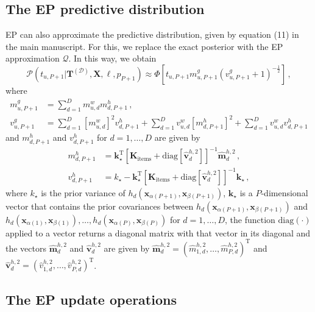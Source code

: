 \documentclass{article}
\begin{document}
\subsection{The EP predictive distribution}

EP can also approximate the predictive distribution, given by equation (11) in the main manuscript. 
For this, we replace the exact posterior with the EP approximation $\mathcal{Q}$. In this way, we obtain
\begin{equation}
\mathcal{P}(t_{u,P+1}|\mathbf{T}^{(\mathcal{D})},\mathbf{X},\ell,p_{P+1}) \approx 
\Phi\left[t_{u,P+1} m_{u,P+1}^g(v_{u,P+1}^g + 1)^{-\frac{1}{2}}\right]\,,
\end{equation}
where
\begin{align}
m_{u,P+1}^g & = \sum_{d=1}^D  m_{u,d}^w m_{d,P+1}^h\,,\\
v_{u,P+1}^g & = \sum_{d=1}^D  [m_{u,d}^w]^2 v_{d,P+1}^h + \sum_{d=1}^D v_{u,d}^w [m_{d,P+1}^h]^2 + \sum_{d=1}^D v_{u,d}^w v_{d,P+1}^h
\end{align}
and $m_{d,P+1}^h$ and $v_{d,P+1}^h$ for $d = 1,\ldots,D$ are given by
\begin{align}
m_{d,P+1}^h & = \mathbf{k}_\star^\text{T} \left[ \mathbf{K}_\text{items} +
\text{diag}[\hat{\mathbf{v}}_d^{h,2}] \right]^{-1} \hat{\mathbf{m}}_d^{h,2}\,,\label{eq:predictiveMean}\\
v_{d,P+1}^h & = k_\star - \mathbf{k}_\star^\text{T} \left[ \mathbf{K}_\text{items} +
\text{diag}[\hat{\mathbf{v}}_d^{h,2}] \right]^{-1} \mathbf{k}_\star\,,\label{eq:predictiveVariance}
\end{align}
where $k_\star$ is the prior variance of $h_d(\mathbf{x}_{\alpha(P+1)}, \mathbf{x}_{\beta(P+1)})$,
$\mathbf{k}_\star$ is a $P$-dimensional vector that contains the prior covariances between $h_d(\mathbf{x}_{\alpha(P+1)}, \mathbf{x}_{\beta(P+1)})$
and $h_d(\mathbf{x}_{\alpha(1)}, \mathbf{x}_{\beta(1)}),\ldots,h_d(\mathbf{x}_{\alpha(P)}, \mathbf{x}_{\beta(P)})$ for $d=1,\ldots,D$,
the function $\text{diag}(\cdot)$ applied to a vector returns a diagonal matrix with that vector in
its diagonal and the vectors $\hat{\mathbf{m}}_d^{h,2}$ and $\hat{\mathbf{v}}_d^{h,2}$ are given by
$\hat{\mathbf{m}}_d^{h,2}=(\hat{m}_{1,d}^{h,2},\ldots,\hat{m}_{P,d}^{h,2})^\text{T}$ and
$\hat{\mathbf{v}}_d^{h,2}=(\hat{v}_{1,d}^{h,2},\ldots,\hat{v}_{P,d}^{h,2})^\text{T}$.

\subsection{The EP update operations}
\end{document}
